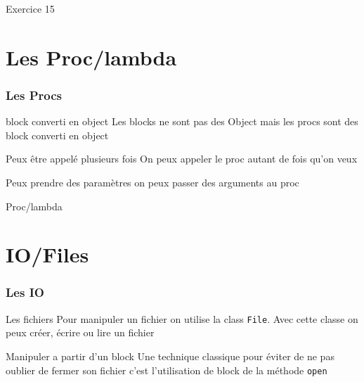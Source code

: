 \documentclass{beamer}
\begin{document}
\begin{frame}
  \begin{beamerboxesrounded}{Exercice 15}
    
  \end{beamerboxesrounded}
\end{frame}

\section{Les Proc/lambda}

\begin{frame}
  \frametitle{Les Procs}
  \begin{block}{block converti en object}
    Les blocks ne sont pas des Object mais les procs sont des block converti en object
  \end{block}
  \begin{block}{Peux être appel\'e plusieurs fois}
    On peux appeler le proc autant de fois qu'on veux
  \end{block}
  \begin{block}{Peux prendre des paramètres}
    on peux passer des arguments au proc
  \end{block}
\end{frame}

\begin{frame}
  \begin{beamerboxesrounded}{Proc/lambda}
    
  \end{beamerboxesrounded}
\end{frame}

\section{IO/Files}

\begin{frame}
  \frametitle{Les IO}
  \begin{block}{Les fichiers}
    Pour manipuler un fichier on utilise la class \verb?File?. Avec cette classe
    on peux cr\'eer, \'ecrire ou lire un fichier
  \end{block}
  \begin{block}{Manipuler a partir d'un block}
    Une technique classique pour \'eviter de ne pas oublier de fermer son fichier
    c'est l'utilisation de block de la m\'ethode \verb?open?
  \end{block}
\end{frame}
\end{document}
